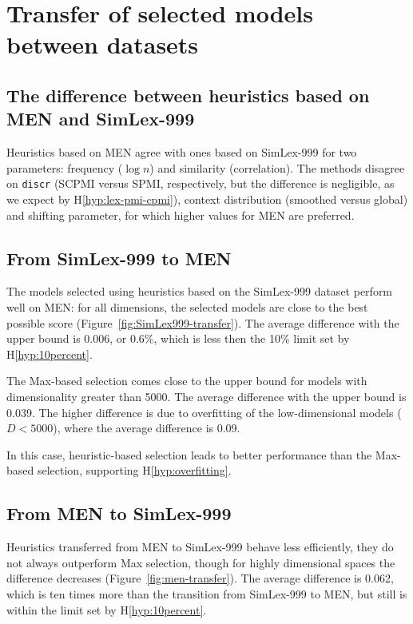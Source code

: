 \section{Transfer of selected models between datasets}
\label{sec:select-model-transf}

\subsection{The difference between heuristics based on MEN and SimLex-999}

Heuristics based on MEN agree with ones based on SimLex-999 for two parameters: frequency ($\log n$) and similarity (correlation). The methods disagree on \texttt{discr} (SCPMI versus SPMI, respectively, but the difference is negligible, as we expect by H\ref{hyp:lex-pmi-cpmi}), context distribution (smoothed versus global) and shifting parameter, for which higher values for MEN are preferred.

\subsection{From SimLex-999 to MEN}
\label{sec:simlex-men}



The models selected using heuristics based on the SimLex-999 dataset perform well on MEN: for all dimensions, the selected models are close to the best possible score (Figure~\ref{fig:SimLex999-transfer}). The average difference with the upper bound is 0.006, or 0.6\%, which is less then the 10\% limit set by H\ref{hyp:10percent}.
%
%
%

The Max-based selection comes close to the upper bound for models with dimensionality greater than 5000. The average difference with the upper bound is 0.039. The higher difference is due to overfitting of the low-dimensional models ($D < 5000$), where the average difference is 0.09.

In this case, heuristic-based selection leads to better performance than the Max-based selection, supporting H\ref{hyp:overfitting}.

\subsection{From MEN to SimLex-999}

Heuristics transferred from MEN to SimLex-999 behave less efficiently, they do not always outperform Max selection, though for highly dimensional spaces the difference decreases (Figure~\ref{fig:men-transfer}). The average difference is 0.062, which is ten times more than the transition from SimLex-999 to MEN, but still is within the limit set by H\ref{hyp:10percent}.


